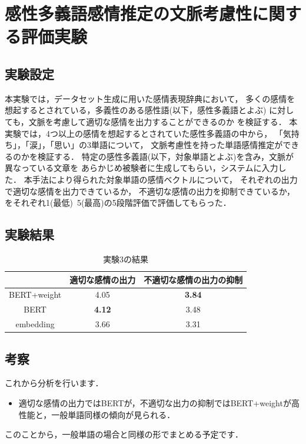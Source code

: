 \section{感性多義語感情推定の文脈考慮性に関する評価実験}
	\subsection{実験設定}
	本実験では，データセット生成に用いた感情表現辞典において，
	多くの感情を想起するとされている，多義性のある感性語(以下，感性多義語とよぶ)
	に対しても，文脈を考慮して適切な感情を出力することができるのか
	を検証する．
	本実験では，4つ以上の感情を想起するとされていた感性多義語の中から，
	「気持ち」，「涙」，「思い」の3単語について，
	文脈考慮性を持った単語感情推定ができるのかを検証する．
	特定の感性多義語(以下，対象単語とよぶ)を含み，文脈が異なっている文章を
	あらかじめ被験者に生成してもらい，システムに入力した．
	本手法により得られた対象単語の感情ベクトルについて，
	それぞれの出力で適切な感情を出力できているか，
	不適切な感情の出力を抑制できているか，
	をそれぞれ1(最低)~5(最高)の5段階評価で評価してもらった．
	

	\subsection{実験結果}
	\begin{table}[H]
		\centering
		\caption{実験3の結果}
		\label{kansei_tagigo_result}
			\begin{tabular}{ccc}
				\hline
				& 適切な感情の出力 & 不適切な感情の出力の抑制 \\
				\hline \hline
				BERT+weight & 4.05 & \textbf{3.84} \\
				BERT & \textbf{4.12} & 3.48 \\
				embedding & 3.66 & 3.31 \\
				\hline
			\end{tabular}
	\end{table}

	\subsection{考察}
	これから分析を行います．
	\begin{itemize}
		\item 適切な感情の出力ではBERTが，不適切な出力の抑制ではBERT+weightが高性能と，一般単語同様の傾向が見られる．
	\end{itemize}
	このことから，一般単語の場合と同様の形でまとめる予定です．
